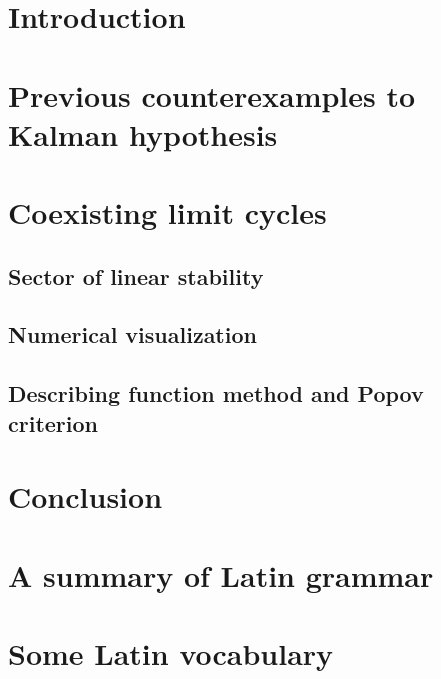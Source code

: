 \documentclass{ifacconf}
\theoremstyle{plain}
\begin{document}
\section{Introduction}
\section{Previous counterexamples to Kalman hypothesis}
\section{Coexisting limit cycles}
\subsection{Sector of linear stability}
\subsection{Numerical visualization}
\subsection{Describing function method and Popov criterion}
\section{Conclusion}
\section{A summary of Latin grammar}
\section{Some Latin vocabulary}
\end{document}
